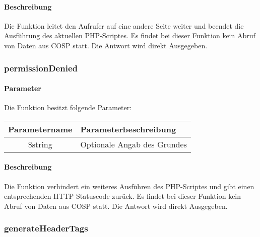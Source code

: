 \paragraph{Beschreibung} Die Funktion leitet den Aufrufer auf eine andere Seite weiter und beendet die Ausführung des aktuellen PHP-Scriptes. Es findet bei dieser Funktion kein Abruf von Daten aus {\glqq COSP\grqq} statt. Die Antwort wird direkt Ausgegeben.
\subsubsection{permissionDenied}
\paragraph{Parameter} Die Funktion besitzt folgende Parameter:
\begin{table}[H]
	\begin{tabular}{|c|p{11cm}|}
		\hline
		\textbf{Parametername} & \textbf{Parameterbeschreibung} \\ \hline
		\$string & Optionale Angab des Grundes \\ \hline
	\end{tabular}
\end{table}
\paragraph{Beschreibung} Die Funktion verhindert ein weiteres Ausführen des PHP-Scriptes und gibt einen entsprechenden HTTP-Statuscode zurück. Es findet bei dieser Funktion kein Abruf von Daten aus {\glqq COSP\grqq} statt. Die Antwort wird direkt Ausgegeben.
\subsubsection{generateHeaderTags}

